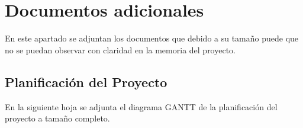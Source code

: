 \chapter{Documentos adicionales}\label{appendix:Documentos}
\thispagestyle{fancy}
En este apartado se adjuntan los documentos que debido a su tamaño puede que no se puedan observar con claridad en la memoria del proyecto.

\section{Planificación del Proyecto}\label{appendix:Documentos_Planificacion}
En la siguiente hoja se adjunta el diagrama GANTT de la planificación del proyecto a tamaño completo.
\newpage
\thispagestyle{empty}

